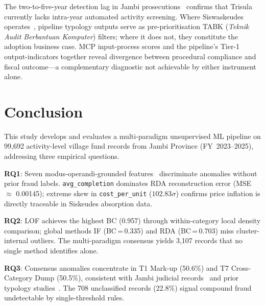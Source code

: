 \documentclass[3p,times,procedia]{elsarticle}
\begin{document}
The two-to-five-year detection lag in Jambi prosecutions~\cite{ref15,ref16,ref17,ref18} confirms that Trisula~\cite{ref4} currently lacks intra-year automated activity screening. Where Siswaskeudes operates~\cite{ref6}, pipeline typology outputs serve as pre-prioritisation TABK (\textit{Teknik Audit Berbantuan Komputer}) filters; where it does not, they constitute the adoption business case. MCP input-process scores and the pipeline’s Tier-1 output-indicators together reveal divergence between procedural compliance and fiscal outcome---a complementary diagnostic not achievable by either instrument alone.

\section{Conclusion}
\label{sec:conclusion}

This study develops and evaluates a multi-paradigm unsupervised ML pipeline on 99,692 activity-level village fund records from Jambi Province (FY~2023--2025), addressing three empirical questions.

\textbf{RQ1}: Seven modus-operandi-grounded features~\cite{ref13,ref14} discriminate anomalies without prior fraud labels. \texttt{avg\_completion} dominates RDA reconstruction error (MSE $\approx$ 0.00145); extreme skew in \texttt{cost\_per\_unit} ($102.83\sigma$) confirms price inflation is directly traceable in Siskeudes absorption data.

\textbf{RQ2}: LOF achieves the highest BC (0.957) through within-category local density comparison; global methods IF (BC\,=\,0.335) and RDA (BC\,=\,0.703) miss cluster-internal outliers. The multi-paradigm consensus yields 3,107 records that no single method identifies alone.

\textbf{RQ3}: Consensus anomalies concentrate in T1 Mark-up (50.6\%) and T7 Cross-Category Dump (50.5\%), consistent with Jambi judicial records~\cite{ref15,ref16,ref17,ref18} and prior typology studies~\cite{ref13,ref14}. The 708 unclassified records (22.8\%) signal compound fraud undetectable by single-threshold rules.
\end{document}
